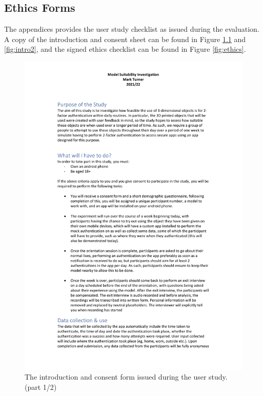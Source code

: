 \documentclass{l4proj}
\begin{document}
\begin{appendices}

\chapter{Ethics Forms}

The appendices provides the user study checklist as issued during the evaluation. A copy of the introduction and consent sheet can be found in Figure \ref{fig:intro1} and \ref{fig:intro2}, and the signed ethics checklist can be found in Figure \ref{fig:ethics}.


\begin{figure}
    \includegraphics[page=1,width=\linewidth]{Appendices/introduction_script_and_consent_form.pdf}
    \caption{The introduction and consent form issued during the user study. (part 1/2)}
    \label{fig:intro1}
\end{figure}


\end{appendices}
\end{document}
